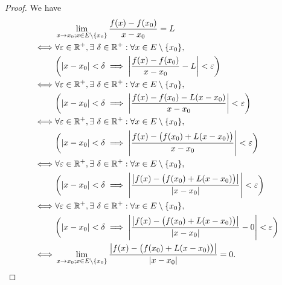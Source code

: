 \begin{proof}
  We have
  \begin{align*}
         & \lim_{x \to x_0 ; x \in E \setminus \{x_0\}} \frac{f(x) - f(x_0)}{x - x_0} = L                                                       \\
    \iff & \forall \varepsilon \in \R^+, \exists\ \delta \in \R^+ : \forall x \in E \setminus \{x_0\},                                          \\
         & \bigg(\abs{x - x_0} < \delta \implies \abs{\frac{f(x) - f(x_0)}{x - x_0} - L} < \varepsilon\bigg)                                    \\
    \iff & \forall \varepsilon \in \R^+, \exists\ \delta \in \R^+ : \forall x \in E \setminus \{x_0\},                                          \\
         & \bigg(\abs{x - x_0} < \delta \implies \abs{\frac{f(x) - f(x_0) - L(x - x_0)}{x - x_0}} < \varepsilon\bigg)                           \\
    \iff & \forall \varepsilon \in \R^+, \exists\ \delta \in \R^+ : \forall x \in E \setminus \{x_0\},                                          \\
         & \bigg(\abs{x - x_0} < \delta \implies \abs{\frac{f(x) - \big(f(x_0) + L(x - x_0)\big)}{x - x_0}} < \varepsilon\bigg)                 \\
    \iff & \forall \varepsilon \in \R^+, \exists\ \delta \in \R^+ : \forall x \in E \setminus \{x_0\},                                          \\
         & \bigg(\abs{x - x_0} < \delta \implies \abs{\frac{\abs{f(x) - \big(f(x_0) + L(x - x_0)\big)}}{\abs{x - x_0}}} < \varepsilon\bigg)     \\
    \iff & \forall \varepsilon \in \R^+, \exists\ \delta \in \R^+ : \forall x \in E \setminus \{x_0\},                                          \\
         & \bigg(\abs{x - x_0} < \delta \implies \abs{\frac{\abs{f(x) - \big(f(x_0) + L(x - x_0)\big)}}{\abs{x - x_0}} - 0} < \varepsilon\bigg) \\
    \iff & \lim_{x \to x_0 ; x \in E \setminus \{x_0\}} \frac{\abs{f(x) - \big(f(x_0) + L(x - x_0)\big)}}{\abs{x - x_0}} = 0.
  \end{align*}
\end{proof}

